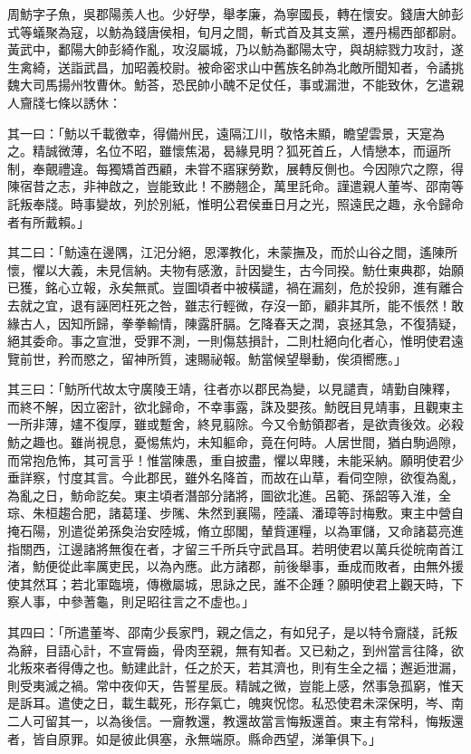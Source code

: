 
\begin{pinyinscope}
周魴字子魚，吳郡陽羨人也。少好學，舉孝廉，為寧國長，轉在懷安。錢唐大帥彭式等蟻聚為寇，以魴為錢唐侯相，旬月之間，斬式首及其支黨，遷丹楊西部都尉。黃武中，鄱陽大帥彭綺作亂，攻沒屬城，乃以魴為鄱陽太守，與胡綜戮力攻討，遂生禽綺，送詣武昌，加昭義校尉。被命密求山中舊族名帥為北敵所聞知者，令譎挑魏大司馬揚州牧曹休。魴荅，恐民帥小醜不足仗任，事或漏泄，不能致休，乞遣親人齎牋七條以誘休：

其一曰：「魴以千載徼幸，得備州民，遠隔江川，敬恪未顯，瞻望雲景，天寔為之。精誠微薄，名位不昭，雖懷焦渴，曷緣見明？狐死首丘，人情戀本，而逼所制，奉覿禮違。每獨矯首西顧，未甞不寤寐勞歎，展轉反側也。今因隙穴之際，得陳宿昔之志，非神啟之，豈能致此！不勝翹企，萬里託命。謹遣親人董岑、邵南等託叛奉牋。時事變故，列於別紙，惟明公君侯垂日月之光，照遠民之趣，永令歸命者有所戴賴。」

其二曰：「魴遠在邊隅，江汜分絕，恩澤教化，未蒙撫及，而於山谷之間，遙陳所懷，懼以大義，未見信納。夫物有感激，計因變生，古今同揆。魴仕東典郡，始願已獲，銘心立報，永矣無貳。豈圖頃者中被橫譴，禍在漏刻，危於投卵，進有離合去就之宜，退有誣罔枉死之咎，雖志行輕微，存沒一節，顧非其所，能不悵然！敢緣古人，因知所歸，拳拳輸情，陳露肝膈。乞降春天之潤，哀拯其急，不復猜疑，絕其委命。事之宣泄，受罪不測，一則傷慈損計，二則杜絕向化者心，惟明使君遠覽前世，矜而愍之，留神所質，速賜祕報。魴當候望舉動，俟須嚮應。」

其三曰：「魴所代故太守廣陵王靖，往者亦以郡民為變，以見譴責，靖勤自陳釋，而終不解，因立密計，欲北歸命，不幸事露，誅及嬰孩。魴旣目見靖事，且觀東主一所非薄，嫿不復厚，雖或蹔舍，終見翦除。今又令魴領郡者，是欲責後效。必殺魴之趣也。雖尚視息，憂惕焦灼，未知軀命，竟在何時。人居世間，猶白駒過隙，而常抱危怖，其可言乎！惟當陳愚，重自披盡，懼以卑賤，未能采納。願明使君少垂詳察，忖度其言。今此郡民，雖外名降首，而故在山草，看伺空隙，欲復為亂，為亂之日，魴命訖矣。東主頃者潛部分諸將，圖欲北進。呂範、孫韶等入淮，全琮、朱桓趨合肥，諸葛瑾、步隲、朱然到襄陽，陸議、潘璋等討梅敷。東主中營自掩石陽，別遣從弟孫奐治安陸城，脩立邸閣，輦貲運糧，以為軍儲，又命諸葛亮進指關西，江邊諸將無復在者，才留三千所兵守武昌耳。若明使君以萬兵從皖南首江渚，魴便從此率厲吏民，以為內應。此方諸郡，前後舉事，垂成而敗者，由無外援使其然耳；若北軍臨境，傳檄屬城，思詠之民，誰不企踵？願明使君上觀天時，下察人事，中參蓍龜，則足昭往言之不虛也。」

其四曰：「所遣董岑、邵南少長家門，親之信之，有如兒子，是以特令齎牋，託叛為辭，目語心計，不宣脣齒，骨肉至親，無有知者。又已勑之，到州當言往降，欲北叛來者得傳之也。魴建此計，任之於天，若其濟也，則有生全之福；邂逅泄漏，則受夷滅之禍。常中夜仰天，告誓星辰。精誠之微，豈能上感，然事急孤窮，惟天是訴耳。遣使之日，載生載死，形存氣亡，魄爽怳惚。私恐使君未深保明，岑、南二人可留其一，以為後信。一齎教還，教還故當言悔叛還首。東主有常科，悔叛還者，皆自原罪。如是彼此俱塞，永無端原。縣命西望，涕筆俱下。」


\end{pinyinscope}
